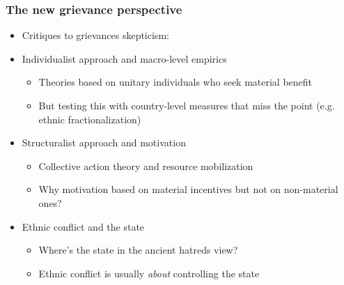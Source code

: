 \documentclass[utf8, xcolor=dvipsnames]{beamer}
\begin{document}
\begin{frame}
\frametitle{The new grievance perspective}
\centering

\begin{itemize}
  \item<1-> Critiques to grievances skepticism:
  \item<2-> Individualist approach and macro-level empirics
  \begin{itemize}
    \item Theories based on unitary individuals who seek material benefit
    \item But testing this with country-level measures that miss the point (e.g. ethnic fractionalization)
  \end{itemize}
  \item<3-> Structuralist approach and motivation
  \begin{itemize}
    \item Collective action theory and resource mobilization
    \item Why motivation based on material incentives but not on non-material ones?
  \end{itemize}
  \item<4-> Ethnic conflict and the state
  \begin{itemize}
    \item Where's the state in the ancient hatreds view?
    \item Ethnic conflict is usually \textit{about} controlling the state
  \end{itemize}
\end{itemize}

\end{frame}
\end{document}
